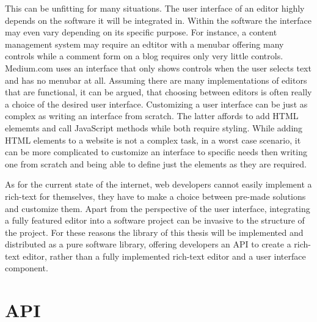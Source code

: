 This can be unfitting for many situations. The user interface of an editor highly depends on the software it will be integrated in. Within the software the interface may even vary depending on its specific purpose. For instance, a content management system may require an edtitor with a menubar offering many controls while a comment form on a blog requires only very little controls. Medium.com uses an interface that only shows controls when the user selects text and has no menubar at all. Assuming there are many implementations of editors that are functional, it can be argued, that choosing between editors is often really a choice of the desired user interface. Customizing a user interface can be just as complex as writing an interface from scratch. The latter affords to add HTML elememts and call JavaScript methods while both require styling. While adding HTML elements to a website is not a complex task, in a worst case scenario, it can be more complicated to customize an interface to specific needs then writing one from scratch and being able to define just the elements as they are required. 

As for the current state of the internet, web developers cannot easily implement a rich-text for themselves, they have to make a choice between pre-made solutions and customize them. Apart from the perspective of the user interface, integrating a fully featured editor into a software project can be invasive to the structure of the project. For these reasons the library of this thesis will be implemented and distributed as a pure software library, offering developers an API to create a rich-text editor, rather than a fully implemented rich-text editor and a user interface component. 



\section{API}
\label{sec:api_design}
\label{sec:las_before_software_architecture}



